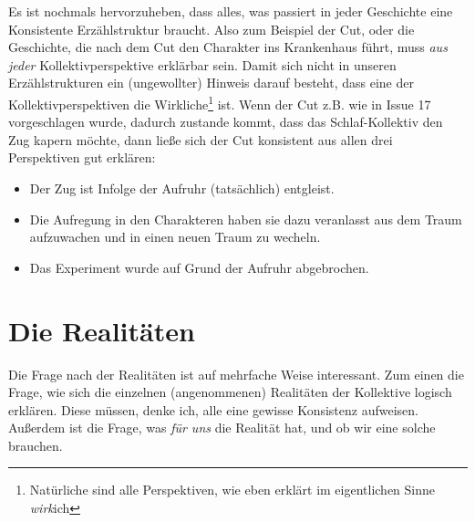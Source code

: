 \documentclass[12pt, a4paper, openany]{report}
\begin{document}
Es ist nochmals hervorzuheben, dass alles, was passiert in jeder Geschichte eine Konsistente Erzählstruktur braucht. 
Also zum Beispiel der Cut, oder die Geschichte, die nach dem Cut den Charakter ins Krankenhaus führt, muss \emph{aus jeder} Kollektivperspektive erklärbar sein.
Damit sich nicht in unseren Erzählstrukturen ein (ungewollter) Hinweis darauf besteht, dass eine der Kollektivperspektiven die Wirkliche\footnote{Natürliche sind alle Perspektiven, wie eben erklärt im eigentlichen Sinne \emph{wirk}ich} ist.
Wenn der Cut z.B. wie in Issue 17 vorgeschlagen wurde, dadurch zustande kommt, dass das Schlaf-Kollektiv den Zug kapern möchte, dann ließe sich der Cut konsistent aus allen drei Perspektiven gut erklären:
\begin{itemize}
    \item[Kollektiv 1:] Der Zug ist Infolge der Aufruhr (tatsächlich) entgleist.
    \item[Kollektiv 2:] Die Aufregung in den Charakteren haben sie dazu
      veranlasst aus dem Traum aufzuwachen und in einen neuen Traum zu wecheln.
    \item[Kollektiv 3:] Das Experiment wurde auf Grund der Aufruhr abgebrochen.
\end{itemize}

\section{Die Realitäten}
Die Frage nach der Realitäten ist auf mehrfache Weise interessant. 
Zum einen die Frage, wie sich die einzelnen (angenommenen) Realitäten der Kollektive logisch erklären. 
Diese müssen, denke ich, alle eine gewisse Konsistenz aufweisen.
Außerdem ist die Frage, was \emph{für uns} die Realität hat, und ob wir eine solche brauchen.\\
\end{document}
